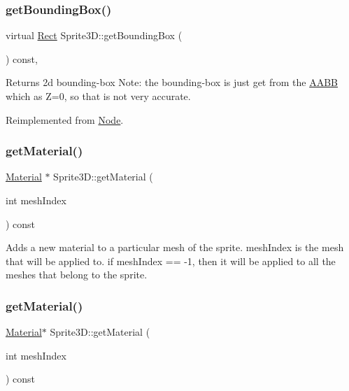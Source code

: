 \subsubsection{\texorpdfstring{get\+Bounding\+Box()}{getBoundingBox()}\hspace{0.1cm}{\footnotesize\ttfamily [2/2]}}
{\footnotesize\ttfamily virtual \hyperlink{classRect}{Rect} Sprite3\+D\+::get\+Bounding\+Box (\begin{DoxyParamCaption}{ }\end{DoxyParamCaption}) const\hspace{0.3cm}{\ttfamily [override]}, {\ttfamily [virtual]}}

Returns 2d bounding-\/box Note\+: the bounding-\/box is just get from the \hyperlink{classAABB}{A\+A\+BB} which as Z=0, so that is not very accurate. 

Reimplemented from \hyperlink{classNode_a7b3849315467fdb992b273fbd3b3fc66}{Node}.

\mbox{\label{classSprite3D_accf93d15ef4ee911082d41cea67964bc}} 
\subsubsection{\texorpdfstring{get\+Material()}{getMaterial()}\hspace{0.1cm}{\footnotesize\ttfamily [1/2]}}
{\footnotesize\ttfamily \hyperlink{classMaterial}{Material} $\ast$ Sprite3\+D\+::get\+Material (\begin{DoxyParamCaption}\item[{int}]{mesh\+Index }\end{DoxyParamCaption}) const}

Adds a new material to a particular mesh of the sprite. mesh\+Index is the mesh that will be applied to. if mesh\+Index == -\/1, then it will be applied to all the meshes that belong to the sprite. \mbox{\label{classSprite3D_ac30aca9c7b7993d49c68cb6c56863e05}} 
\subsubsection{\texorpdfstring{get\+Material()}{getMaterial()}\hspace{0.1cm}{\footnotesize\ttfamily [2/2]}}
{\footnotesize\ttfamily \hyperlink{classMaterial}{Material}$\ast$ Sprite3\+D\+::get\+Material (\begin{DoxyParamCaption}\item[{int}]{mesh\+Index }\end{DoxyParamCaption}) const}

